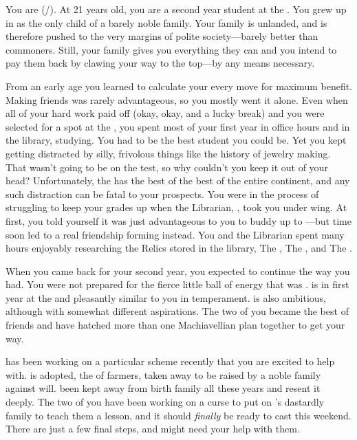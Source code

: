 \documentclass[char]{GL2020}
\begin{document}
\name{\cLibAssist{}}

You are \cLibAssist{\full;} (\cLibAssist{\they}/\cLibAssist{\them}). At 21 years old, you are a second year student at the \pSchool{}. You grew up in \pFarm{} as the only child of a barely noble family. Your family is unlanded, and is therefore pushed to the very margins of polite society---barely better than commoners. Still, your family gives you everything they can and you intend to pay them back by clawing your way to the top---by any means necessary.

From an early age you learned to calculate your every move for maximum benefit. Making friends was rarely advantageous, so you mostly went it alone. Even when all of your hard work paid off (okay, okay, and a lucky break) and you were selected for a spot at the \pSchool{}, you spent most of your first year in office hours and in the library, studying. You had to be the best student you could be. Yet you kept getting distracted by silly, frivolous things like the history of jewelry making. That wasn't going to be on the test, so why couldn't you keep it out of your head? Unfortunately, the \pSc{} has the best of the best of the entire continent, and any such distraction can be fatal to your prospects. You were in the process of struggling to keep your grades up when the Librarian, \cLibrarian{\full}, took you under \cLibrarian{\their} wing. At first, you told yourself it was just advantageous to you to buddy up to \cLibrarian{\them}---but time soon led to a real friendship forming instead. You and the Librarian spent many hours enjoyably researching the Relics stored in the library, The \iLariat{}, The \iNet{}, and The \iScythe{}.

When you came back for your second year, you expected to continue the way you had. You were not prepared for the fierce little ball of energy that was \cAdopted{\full}. \cAdopted{} is in \cAdopted{\their} first year at the \pSc{} and \cAdopted{\theyare} pleasantly similar to you in temperament. \cAdopted{} is also ambitious, although with somewhat different aspirations. The two of you became the best of friends and have hatched more than one Machiavellian plan together to get your way.

\cAdopted{} has been working on a particular scheme recently that you are excited to help with. \cAdopted{} is adopted, the \cAdopted{\child} of farmers, taken away to be raised by a noble family against \cAdopted{\their} will. \cAdopted{\They} \cAdopted{\have} been kept away from \cAdopted{\their} birth family all these years and \cAdopted{\they} resent\cAdopted{\plural} it deeply. The two of you have been working on a curse to put on \cAdopted{}'s dastardly family to teach them a lesson, and it should \emph{finally} be ready to cast this weekend. There are just a few final steps, and \cAdopted{} might need your help with them.
\end{document}
